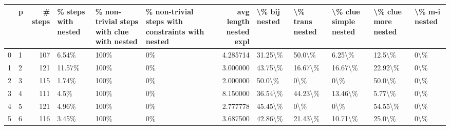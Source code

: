 \begin{tabular}{llrlllrlllll}
\toprule
{} &  p &  \# steps & \% steps with nested & \% non-trivial steps with clue with nested  & \% non-trivial steps with constraints with nested &  avg length nested expl & \textbackslash \% bij nested & \textbackslash \% trans nested & \textbackslash \% clue simple nested & \textbackslash \% clue more nested & \textbackslash \% m-i nested \\
\midrule
0 &  1 &      107 &               6.54\% &                                       100\% &                                               0\% &                4.285714 &       31.25\textbackslash \% &          50.0\textbackslash \% &                6.25\textbackslash \% &              12.5\textbackslash \% &           0\textbackslash \% \\
1 &  2 &      121 &              11.57\% &                                       100\% &                                               0\% &                3.000000 &       43.75\textbackslash \% &         16.67\textbackslash \% &               16.67\textbackslash \% &             22.92\textbackslash \% &           0\textbackslash \% \\
2 &  3 &      115 &               1.74\% &                                       100\% &                                               0\% &                2.000000 &        50.0\textbackslash \% &             0\textbackslash \% &                   0\textbackslash \% &              50.0\textbackslash \% &           0\textbackslash \% \\
3 &  4 &      111 &                4.5\% &                                       100\% &                                               0\% &                8.150000 &       36.54\textbackslash \% &         44.23\textbackslash \% &               13.46\textbackslash \% &              5.77\textbackslash \% &           0\textbackslash \% \\
4 &  5 &      121 &               4.96\% &                                       100\% &                                               0\% &                2.777778 &       45.45\textbackslash \% &             0\textbackslash \% &                   0\textbackslash \% &             54.55\textbackslash \% &           0\textbackslash \% \\
5 &  6 &      116 &               3.45\% &                                       100\% &                                               0\% &                3.687500 &       42.86\textbackslash \% &         21.43\textbackslash \% &               10.71\textbackslash \% &              25.0\textbackslash \% &           0\textbackslash \% \\

\end{tabular}
